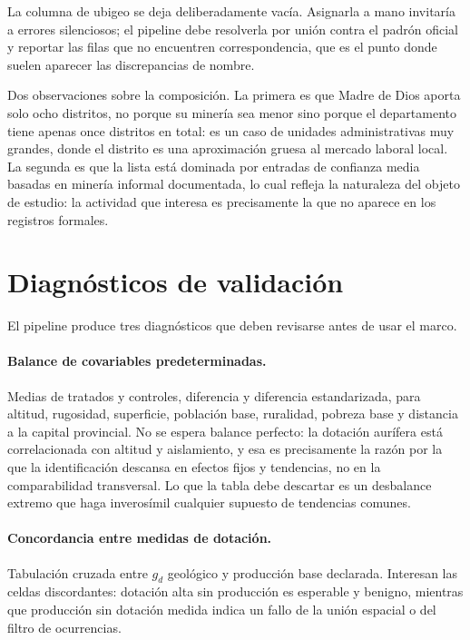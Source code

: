 \documentclass[11pt,a4paper]{article}
\begin{document}
La columna de ubigeo se deja deliberadamente vacía. Asignarla a mano invitaría a errores silenciosos; el pipeline debe resolverla por unión contra el padrón oficial y reportar las filas que no encuentren correspondencia, que es el punto donde suelen aparecer las discrepancias de nombre.

Dos observaciones sobre la composición. La primera es que Madre de Dios aporta solo ocho distritos, no porque su minería sea menor sino porque el departamento tiene apenas once distritos en total: es un caso de unidades administrativas muy grandes, donde el distrito es una aproximación gruesa al mercado laboral local. La segunda es que la lista está dominada por entradas de confianza media basadas en minería informal documentada, lo cual refleja la naturaleza del objeto de estudio: la actividad que interesa es precisamente la que no aparece en los registros formales.

\section{Diagnósticos de validación}

El pipeline produce tres diagnósticos que deben revisarse antes de usar el marco.

\paragraph{Balance de covariables predeterminadas.} Medias de tratados y controles, diferencia y diferencia estandarizada, para altitud, rugosidad, superficie, población base, ruralidad, pobreza base y distancia a la capital provincial. No se espera balance perfecto: la dotación aurífera está correlacionada con altitud y aislamiento, y esa es precisamente la razón por la que la identificación descansa en efectos fijos y tendencias, no en la comparabilidad transversal. Lo que la tabla debe descartar es un desbalance extremo que haga inverosímil cualquier supuesto de tendencias comunes.

\paragraph{Concordancia entre medidas de dotación.} Tabulación cruzada entre $g_d$ geológico y producción base declarada. Interesan las celdas discordantes: dotación alta sin producción es esperable y benigno, mientras que producción sin dotación medida indica un fallo de la unión espacial o del filtro de ocurrencias.
\end{document}
